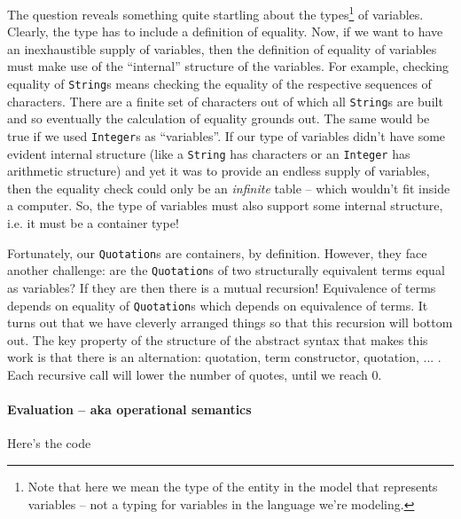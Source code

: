 The question reveals something quite startling about the types\footnote{Note that here we mean the type of the entity in the model that represents variables -- not a typing for variables in the language we're modeling.} of
variables. Clearly, the type has to include a definition of
equality. Now, if we want to have an inexhaustible supply of
variables, then the definition of equality of variables must make use
of the ``internal'' structure of the variables. For example, checking
equality of \lstinline[language=Scala]!String!s means checking the
equality of the respective sequences of characters. There are a finite
set of characters out of which all \lstinline[language=Scala]!String!s
are built and so eventually the calculation of equality grounds
out. The same would be true if we used
\lstinline[language=Scala]!Integer!s as ``variables''. If our type of
variables didn't have some evident internal structure (like a
\lstinline[language=Scala]!String! has characters or an
\lstinline[language=Scala]!Integer! has arithmetic structure) and yet
it was to provide an endless supply of variables, then the equality
check could only be an \emph{infinite} table -- which wouldn't fit
inside a computer. So, the type of variables must also support some
internal structure, i.e. it must be a container type!

Fortunately, our \lstinline[language=Scala]!Quotation!s are
containers, by definition. However, they face another challenge: are
the \lstinline[language=Scala]!Quotation!s of two structurally
equivalent terms equal as variables? If they are then there is a
mutual recursion! Equivalence of terms depends on equality of
\lstinline[language=Scala]!Quotation!s which depends on equivalence of
terms. It turns out that we have cleverly arranged things so that this
recursion will bottom out. The key property of the structure of the
abstract syntax that makes this work is that there is an alternation:
quotation, term constructor, quotation, ... . Each recursive call will
lower the number of quotes, until we reach 0.

\paragraph{Evaluation -- aka operational semantics}

Here's the code

